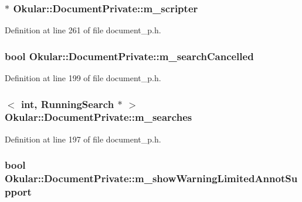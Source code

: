 \hypertarget{classOkular_1_1DocumentPrivate_aa92ce51e07aaab18bd40542eb9bc31e6}{
\subsubsection[{m\+\_\+scripter}]{$\ast$ Okular\+::\+Document\+Private\+::m\+\_\+scripter}}\label{classOkular_1_1DocumentPrivate_aa92ce51e07aaab18bd40542eb9bc31e6}


Definition at line 261 of file document\+\_\+p.\+h.

\hypertarget{classOkular_1_1DocumentPrivate_ad852d630ad63f8fd4ce1b2cc93179c91}{
\subsubsection[{m\+\_\+search\+Cancelled}]{\setlength{\rightskip}{0pt plus 5cm}bool Okular\+::\+Document\+Private\+::m\+\_\+search\+Cancelled}}\label{classOkular_1_1DocumentPrivate_ad852d630ad63f8fd4ce1b2cc93179c91}


Definition at line 199 of file document\+\_\+p.\+h.

\hypertarget{classOkular_1_1DocumentPrivate_a42420dd45075092b921a829b8e9f2214}{
\subsubsection[{m\+\_\+searches}]{$<$ int, {\bf Running\+Search} $\ast$ $>$ Okular\+::\+Document\+Private\+::m\+\_\+searches}}\label{classOkular_1_1DocumentPrivate_a42420dd45075092b921a829b8e9f2214}


Definition at line 197 of file document\+\_\+p.\+h.

\hypertarget{classOkular_1_1DocumentPrivate_a1d12aaa9b1f2726a8e19b416587062c9}{
\subsubsection[{m\+\_\+show\+Warning\+Limited\+Annot\+Support}]{\setlength{\rightskip}{0pt plus 5cm}bool Okular\+::\+Document\+Private\+::m\+\_\+show\+Warning\+Limited\+Annot\+Support}}\label{classOkular_1_1DocumentPrivate_a1d12aaa9b1f2726a8e19b416587062c9}



